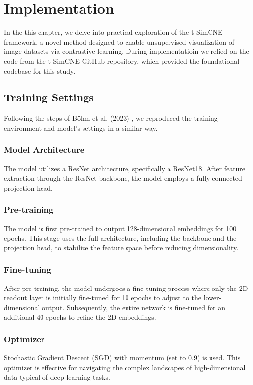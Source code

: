 \chapter{Implementation}

In the this chapter, we delve into practical exploration of the t-SimCNE framework, a novel method designed to enable unsupervised visualization of image datasets via contrastive learning. During implementatioin we relied on the code from the t-SimCNE GitHub repository, which provided the foundational codebase for this study.

\section{Training Settings}

Following the steps of Böhm et al. (2023) \cite{tsimcne}, we reproduced the training environment and model's settings in a similar way.

\subsection{Model Architecture}

The model utilizes a ResNet architecture, specifically a ResNet18. After feature extraction through the ResNet backbone, the model employs a fully-connected projection head.

\subsection{Pre-training}
The model is first pre-trained to output 128-dimensional embeddings for 100 epochs. This stage uses the full architecture, including the backbone and the projection head, to stabilize the feature space before reducing dimensionality.

\subsection{Fine-tuning}
After pre-training, the model undergoes a fine-tuning process where only the 2D readout layer is initially fine-tuned for 10 epochs to adjust to the lower-dimensional output. Subsequently, the entire network is fine-tuned for an additional 40 epochs to refine the 2D embeddings.

\subsection{Optimizer}
Stochastic Gradient Descent (SGD) with momentum (set to 0.9) is used. This optimizer is effective for navigating the complex landscapes of high-dimensional data typical of deep learning tasks.

